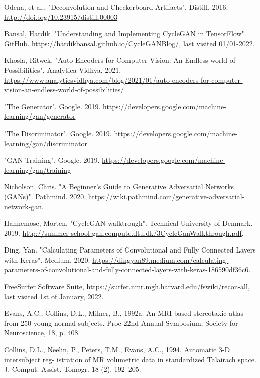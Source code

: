 \documentclass[12pt, fleqn, titlepage]{article}
\newcommand{\1}[1]{\mathds{1}\left[#1\right]}
\begin{document}
\begin{thebibliography}{9}
		 Odena, et al., "Deconvolution and Checkerboard Artifacts", Distill, 2016. \url{http://doi.org/10.23915/distill.00003}
		
		 Bansal, Hardik. "Understanding and Implementing CycleGAN in TensorFlow". GitHub. \url{https://hardikbansal.github.io/CycleGANBlog/, last visited 01/01-2022}.
		
		 Khosla, Ritwek. "Auto-Encoders for Computer Vision: An Endless world of Possibilities". Analytica Vidhya. 2021. \url{https://www.analyticsvidhya.com/blog/2021/01/auto-encoders-for-computer-vision-an-endless-world-of-possibilities/}
		
		 "The Generator". Google. 2019. \url{https://developers.google.com/machine-learning/gan/generator}
		
		 "The Discriminator". Google. 2019. \url{https://developers.google.com/machine-learning/gan/discriminator}
		
		 "GAN Training". Google. 2019. \url{https://developers.google.com/machine-learning/gan/training}
		
		 Nicholson, Chris. "A Beginner's Guide to Generative Adversarial Networks (GANs)". Pathmind. 2020. \url{https://wiki.pathmind.com/generative-adversarial-network-gan}.
		
		 Hannemose, Morten. "CycleGAN walktrough". Technical University of Denmark. 2019. \url{http://summer-school-gan.compute.dtu.dk/3CycleGanWalkthrough.pdf}.
		
		 Ding, Yan. "Calculating Parameters of Convolutional and Fully Connected Layers with Keras". Medium. 2020. \url{https://dingyan89.medium.com/calculating-parameters-of-convolutional-and-fully-connected-layers-with-keras-186590df36c6}.

		 FreeSurfer Software Suite, \url{https://surfer.nmr.mgh.harvard.edu/fswiki/recon-all}, last visited 1st of January, 2022.
		
		 Evans, A.C., Collins, D.L., Milner, B., 1992a. An MRI-based stereotaxic atlas from 250 young normal subjects. Proc 22nd Annual Symposium, Society for Neuroscience, 18, p. 408
		
		 Collins, D.L., Neelin, P., Peters, T.M., Evans, A.C., 1994. Automatic 3-D intersubject reg- istration of MR volumetric data in standardized Talairach space. J. Comput. Assist. Tomogr. 18 (2), 192–205.
		

\end{thebibliography}
\end{document}
